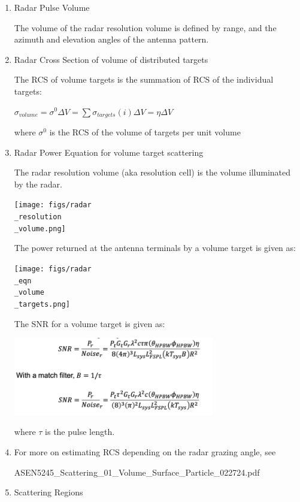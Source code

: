 \documentclass[10pt]{article}
\begin{document}
\begin{enumerate}





\item Radar Pulse Volume

The volume of the radar resolution volume is defined by range, and the
azimuth and elevation angles of the antenna pattern.




\item Radar Cross Section of volume of distributed targets

The RCS of volume targets is the summation of RCS of the individual targets:

$\sigma_{volume} = \sigma^0 \Delta V = \sum \sigma_{targets}(i) \Delta V = \eta \Delta V$

where $\sigma^0$ is the RCS of the volume of targets per unit volume


\item Radar Power Equation for volume target scattering

The radar resolution volume (aka resolution cell) is the volume
illuminated by the radar.

\texttt{[image: figs/radar\\\_resolution\\\_volume.png]}

The power returned at the antenna terminals by a volume target is given as:

\texttt{[image: figs/radar\\\_eqn\\\_volume\\\_targets.png]}

The SNR for a volume target is given as:

\includegraphics[width=0.69\textwidth]{figs/SNRVolume.png}

where $\tau$ is the pulse length.




\item For more on estimating RCS depending on the radar grazing angle, see 

ASEN5245\_Scattering\_01\_Volume\_Surface\_Particle\_022724.pdf



\item Scattering Regions


\end{enumerate}
\end{document}
